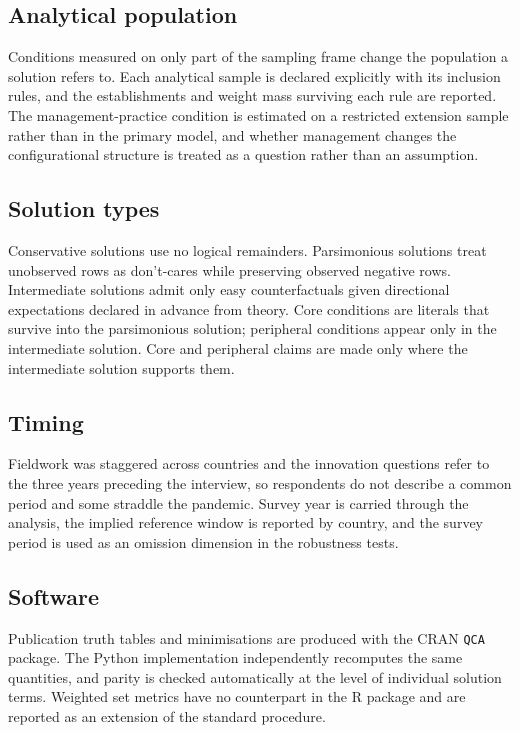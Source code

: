 \subsection{Analytical population}

Conditions measured on only part of the sampling frame change the population a
solution refers to. Each analytical sample is declared explicitly with its
inclusion rules, and the establishments and weight mass surviving each rule are
reported. The management-practice condition is estimated on a restricted
extension sample rather than in the primary model, and whether management
changes the configurational structure is treated as a question rather than an
assumption.

\subsection{Solution types}

Conservative solutions use no logical remainders. Parsimonious solutions treat
unobserved rows as don't-cares while preserving observed negative rows.
Intermediate solutions admit only easy counterfactuals given directional
expectations declared in advance from theory. Core conditions are literals that
survive into the parsimonious solution; peripheral conditions appear only in the
intermediate solution. Core and peripheral claims are made only where the
intermediate solution supports them.

\subsection{Timing}

Fieldwork was staggered across countries and the innovation questions refer to
the three years preceding the interview, so respondents do not describe a common
period and some straddle the pandemic. Survey year is carried through the
analysis, the implied reference window is reported by country, and the survey
period is used as an omission dimension in the robustness tests.

\subsection{Software}

Publication truth tables and minimisations are produced with the CRAN
\texttt{QCA} package. The Python implementation independently recomputes the
same quantities, and parity is checked automatically at the level of individual
solution terms. Weighted set metrics have no counterpart in the R package and
are reported as an extension of the standard procedure.

